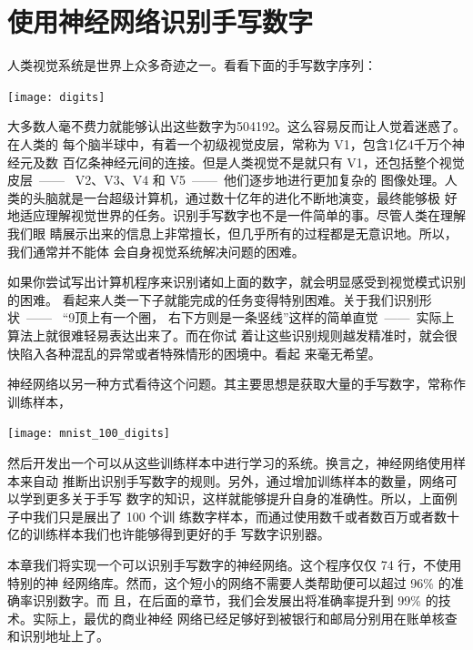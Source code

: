 
\chapter{使用神经网络识别手写数字}
\label{ch:UsingNeuralNetsToRecognizeHandwrittenDigits}

人类视觉系统是世界上众多奇迹之一。看看下面的手写数字序列：
\begin{center}
  \texttt{[image: digits]}\label{fig:digits}
\end{center}

大多数人毫不费力就能够认出这些数字为504192。这么容易反而让人觉着迷惑了。在人类的
每个脑半球中，有着一个初级视觉皮层，常称为 {\serif V1}，包含1亿4千万个神经元及数
百亿条神经元间的连接。但是人类视觉不是就只有 {\serif V1}，还包括整个视觉皮层~——~
{\serif V2}、{\serif V3}、{\serif V4} 和 {\serif V5}~——~他们逐步地进行更加复杂的
图像处理。人类的头脑就是一台超级计算机，通过数十亿年的进化不断地演变，最终能够极
好地适应理解视觉世界的任务。识别手写数字也不是一件简单的事。尽管人类在理解我们眼
睛展示出来的信息上非常擅长，但几乎所有的过程都是无意识地。所以，我们通常并不能体
会自身视觉系统解决问题的困难。

如果你尝试写出计算机程序来识别诸如上面的数字，就会明显感受到视觉模式识别的困难。
看起来人类一下子就能完成的任务变得特别困难。关于我们识别形状~——~ “9顶上有一个圈，
右下方则是一条竖线”这样的简单直觉~——~实际上算法上就很难轻易表达出来了。而在你试
着让这些识别规则越发精准时，就会很快陷入各种混乱的异常或者特殊情形的困境中。看起
来毫无希望。

神经网络以另一种方式看待这个问题。其主要思想是获取大量的手写数字，常称作训练样本，
\begin{center}
  \texttt{[image: mnist\_100\_digits]}
\end{center}

然后开发出一个可以从这些训练样本中进行学习的系统。换言之，神经网络使用样本来自动
推断出识别手写数字的规则。另外，通过增加训练样本的数量，网络可以学到更多关于手写
数字的知识，这样就能够提升自身的准确性。所以，上面例子中我们只是展出了 100 个训
练数字样本，而通过使用数千或者数百万或者数十亿的训练样本我们也许能够得到更好的手
写数字识别器。

本章我们将实现一个可以识别手写数字的神经网络。这个程序仅仅 74 行，不使用特别的神
经网络库。然而，这个短小的网络不需要人类帮助便可以超过 96\% 的准确率识别数字。而
且，在后面的章节，我们会发展出将准确率提升到 99\% 的技术。实际上，最优的商业神经
网络已经足够好到被银行和邮局分别用在账单核查和识别地址上了。

